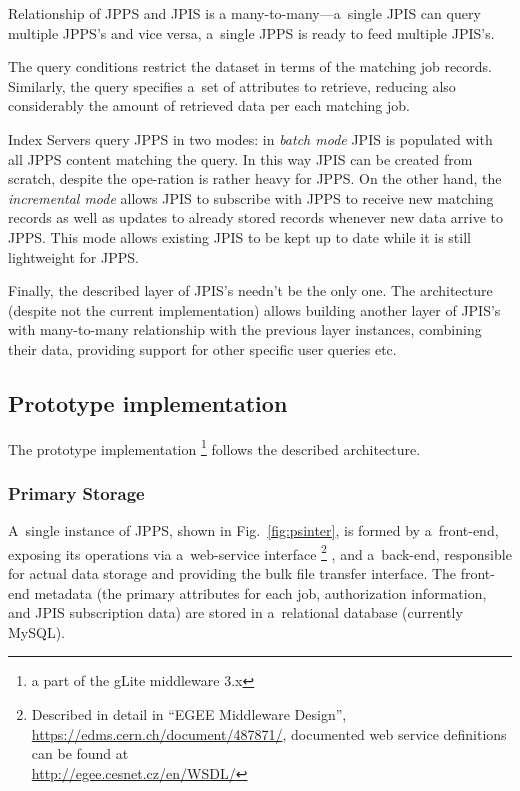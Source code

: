 Relationship of JPPS and JPIS is a many-to-many---a~single JPIS can query
multiple JPPS's and vice versa, a~single JPPS is ready to feed multiple JPIS's.

The query conditions restrict the dataset in terms of the matching job records.
Similarly, the query specifies a~set of attributes to retrieve,
reducing also considerably the amount of retrieved data per each matching job.

Index Servers query JPPS in two modes: in \emph{batch mode} JPIS is populated
with all JPPS content matching the query. In this way JPIS can be created
from scratch, despite the ope-ration is rather heavy for JPPS.
On the other hand, the \emph{incremental mode} allows JPIS to subscribe with
JPPS to receive new matching records as well as updates to already stored
records whenever new data arrive to JPPS.
This mode allows existing JPIS to be kept up to date while it is 
still lightweight for JPPS.

Finally, the described layer of JPIS's needn't be the only one.
The architecture (despite not the current implementation) allows
building another layer of JPIS's with many-to-many relationship with
the previous layer instances, combining their data, providing support
for other specific user queries etc.

\subsection{Prototype implementation}

The \JP prototype implementation%
\footnote{a part of the gLite middleware 3.x}
follows the described architecture.

\subsubsection{Primary Storage}%
\label{primary}

A~single instance of JPPS, shown in Fig.~\ref{fig:psinter},
is formed by a~front-end, exposing
its operations via a~web-service interface%
\footnote{Described in detail in ``EGEE Middleware
Design'',\\ \url{https://edms.cern.ch/document/487871/},
documented web service definitions can be found at \\
\url{http://egee.cesnet.cz/en/WSDL/}}%
, and a~back-end, responsible
for actual data storage and providing the bulk file transfer interface.
The front-end metadata (the primary attributes for each job,
authorization information, and JPIS subscription data)
are stored in a~relational database (currently MySQL).

